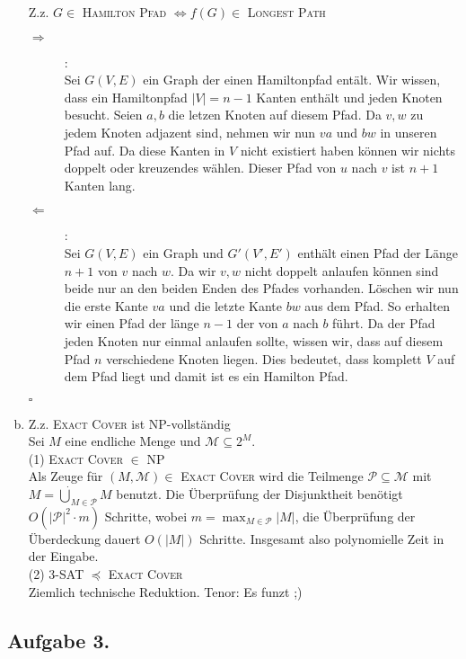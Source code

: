 \documentclass[11pt,a4paper,ngerman]{article}
\begin{document}
\begin{enumerate}[a)]
Z.z. $G \in $ \textsc{Hamilton Pfad} $\Leftrightarrow f(G) \in $ \textsc{Longest Path}\\
\begin{description}
    \item[$\Rightarrow$]:\\
        Sei $G(V,E)$ ein Graph der einen Hamiltonpfad entält.
        Wir wissen, dass ein Hamiltonpfad $|V| = n-1$ Kanten enthält und jeden Knoten besucht.
        Seien $a,b$ die letzen Knoten auf diesem Pfad. Da $v,w$ zu jedem Knoten adjazent sind, nehmen wir nun $va$ und $bw$ in unseren
        Pfad auf. Da diese Kanten in $V$ nicht existiert haben können wir nichts doppelt oder kreuzendes wählen.
        Dieser Pfad von $u$ nach $v$ ist $n+1$ Kanten lang.
    \item[$\Leftarrow$]:\\
        Sei $G(V,E)$ ein Graph und $G'(V',E')$ enthält einen Pfad der Länge $n+1$ von $v$ nach $w$.
        Da wir $v,w$ nicht doppelt anlaufen können sind beide nur an den beiden Enden des Pfades vorhanden.
        Löschen wir nun die erste Kante $va$ und die letzte Kante $bw$ aus dem Pfad. So erhalten wir einen Pfad der länge
        $n-1$ der von $a$ nach $b$ führt.
        Da der Pfad jeden Knoten nur einmal anlaufen sollte, wissen wir, dass auf diesem Pfad $n$ verschiedene Knoten liegen.
        Dies bedeutet, dass komplett $V$ auf dem Pfad liegt und damit ist es ein Hamilton Pfad.
\end{description}
\mbox{}\hfill $\square$


\item Z.z. \textsc{Exact Cover} ist NP-vollständig \\
Sei $M$ eine endliche Menge und $\mathcal{M} \subseteq 2^M$.\\
(1) \textsc{Exact Cover} $\in$ NP \\
Als Zeuge für $(M,\mathcal{M}) \in$ \textsc{Exact Cover} wird die Teilmenge $\mathcal{P} \subseteq \mathcal{M}$ mit $M = \dot\bigcup_{M \in \mathcal{P}} M$ benutzt. Die Überprüfung der Disjunktheit benötigt $O(|\mathcal{P}|^2 \cdot m)$ Schritte, wobei $m = \max_{M \in \mathcal{P}} |M|$, die Überprüfung der Überdeckung dauert $O(|M|)$ Schritte. Insgesamt also polynomielle Zeit in der Eingabe.\\
(2) \textsc{3-SAT} $\preceq$ \textsc{Exact Cover} \\
Ziemlich technische Reduktion. Tenor: Es funzt ;)
\end{enumerate}
\subsection*{Aufgabe 3.}
\end{document}
